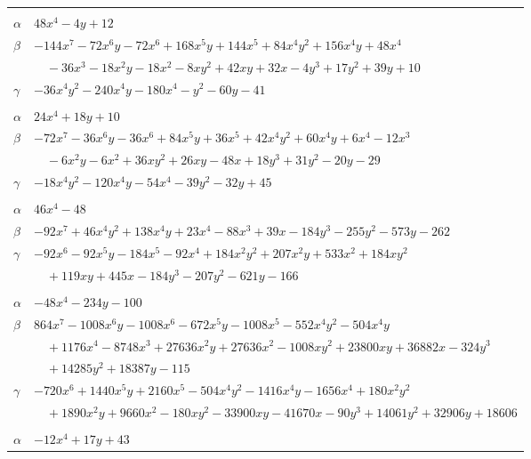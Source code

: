 \documentclass[11pt]{article}
\begin{document}
\begin{longtable}{@{}ll@{}}
\addlinespace[3pt]
\multicolumn{2}{@{}l}{$\{i,j\}=\{4,19\}$, $k_{ij}=2$}\\
$\alpha$ & $48x^{4}-4y+12$\\
$\beta$ & $-144x^{7}-72x^{6}y-72x^{6}+168x^{5}y+144x^{5}+84x^{4}y^{2}+156x^{4}y+48x^{4}$\\
 & $\quad -36x^{3}-18x^{2}y-18x^{2}-8xy^{2}+42xy+32x-4y^{3}+17y^{2}+39y+10$\\
$\gamma$ & $-36x^{4}y^{2}-240x^{4}y-180x^{4}-y^{2}-60y-41$\\
\addlinespace[3pt]
\multicolumn{2}{@{}l}{$\{i,j\}=\{4,27\}$, $k_{ij}=2^{2}\cdot 3\cdot 7$}\\
$\alpha$ & $24x^{4}+18y+10$\\
$\beta$ & $-72x^{7}-36x^{6}y-36x^{6}+84x^{5}y+36x^{5}+42x^{4}y^{2}+60x^{4}y+6x^{4}-12x^{3}$\\
 & $\quad -6x^{2}y-6x^{2}+36xy^{2}+26xy-48x+18y^{3}+31y^{2}-20y-29$\\
$\gamma$ & $-18x^{4}y^{2}-120x^{4}y-54x^{4}-39y^{2}-32y+45$\\
\addlinespace[3pt]
\multicolumn{2}{@{}l}{$\{i,j\}=\{4,35\}$, $k_{ij}=2^{4}\cdot 3$}\\
$\alpha$ & $46x^{4}-48$\\
$\beta$ & $-92x^{7}+46x^{4}y^{2}+138x^{4}y+23x^{4}-88x^{3}+39x-184y^{3}-255y^{2}-573y-262$\\
$\gamma$ & $-92x^{6}-92x^{5}y-184x^{5}-92x^{4}+184x^{2}y^{2}+207x^{2}y+533x^{2}+184xy^{2}$\\
 & $\quad +119xy+445x-184y^{3}-207y^{2}-621y-166$\\
\addlinespace[3pt]
\multicolumn{2}{@{}l}{$\{i,j\}=\{4,58\}$, $k_{ij}=3\cdot 5$}\\
$\alpha$ & $-48x^{4}-234y-100$\\
$\beta$ & $864x^{7}-1008x^{6}y-1008x^{6}-672x^{5}y-1008x^{5}-552x^{4}y^{2}-504x^{4}y$\\
 & $\quad +1176x^{4}-8748x^{3}+27636x^{2}y+27636x^{2}-1008xy^{2}+23800xy+36882x-324y^{3}$\\
 & $\quad +14285y^{2}+18387y-115$\\
$\gamma$ & $-720x^{6}+1440x^{5}y+2160x^{5}-504x^{4}y^{2}-1416x^{4}y-1656x^{4}+180x^{2}y^{2}$\\
 & $\quad +1890x^{2}y+9660x^{2}-180xy^{2}-33900xy-41670x-90y^{3}+14061y^{2}+32906y+18606$\\
\addlinespace[3pt]
\multicolumn{2}{@{}l}{$\{i,j\}=\{4,64\}$, $k_{ij}=2^{5}\cdot 3\cdot 5$}\\
$\alpha$ & $-12x^{4}+17y+43$\\

\end{longtable}
\end{document}

